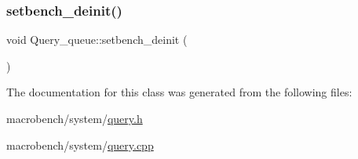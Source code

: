 \mbox{\label{classQuery__queue_a3a8dbf987f4aac6af22083227cb30dac}} 
\subsubsection{\texorpdfstring{setbench\+\_\+deinit()}{setbench\_deinit()}}
{\footnotesize\ttfamily void Query\+\_\+queue\+::setbench\+\_\+deinit (\begin{DoxyParamCaption}{ }\end{DoxyParamCaption})}



The documentation for this class was generated from the following files\+:\begin{DoxyCompactItemize}
\item 
macrobench/system/\hyperlink{query_8h}{query.\+h}\item 
macrobench/system/\hyperlink{query_8cpp}{query.\+cpp}\end{DoxyCompactItemize}
